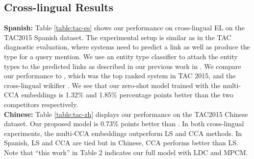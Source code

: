 \documentclass[letterpaper]{article} \usepackage{aaai18}  \usepackage{times}  \usepackage{helvet}  \usepackage{courier}  \usepackage{url}  \usepackage{graphicx}  \frenchspacing  \setlength{\pdfpagewidth}{8.5in}  \setlength{\pdfpageheight}{11in}  \usepackage{latexsym}
\begin{document}
\subsection{Cross-lingual Results}
\textbf{Spanish:} Table \ref{table:tac-es} shows our performance on cross-lingual EL on the TAC2015 Spanish dataset. The experimental setup is similar as in the TAC diagnostic evaluation, where systems need to predict a link as well as produce the type for a query mention. We use an entity type classifier to attach the entity types to the predicted links as described in our previous work in \cite{sil2015ibm}. We compare our performance to \cite{sil2016one}, which was the top ranked system in TAC 2015, and the cross-lingual wikifier \cite{tsai2016cross}. We see that our zero-shot model trained with the multi-CCA embeddings is 1.32\% and 1.85\% percentage points better than the two competitors respectively.\\
\textbf{Chinese:} Table \ref{table:tac-zh} displays our performance on the TAC2015 Chinese dataset. 
Our proposed model is 0.73\% points better than \cite{tsai2016cross}. In both cross-lingual experiments, the multi-CCA embeddings outperform LS and CCA methods. In Spanish, LS and CCA are tied but in Chinese, CCA performs better than LS. Note that ``this work'' in Table 2 indicates our full model with LDC and MPCM.
\begin{table*} 
\centering
\small
{}\quad \quad
{}
\caption{\textbf{Performance comparison on the TAC 2015 Spanish and Chinese datasets.} Our system outperforms all the previous EL systems.}


\end{table*}
\end{document}
